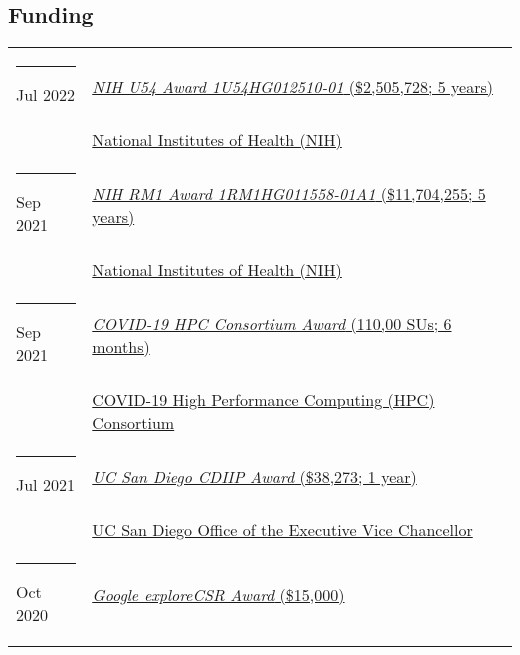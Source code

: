 \documentclass[margin,line]{res}
\begin{document}
\begin{resume}
\section{\sc Funding}
\begin{longtable}{@{}p{0.7in}p{4in}}
\hspace*{-4mm} \rule{-1mm}{5mm} Jul 2022 & \href{https://reporter.nih.gov/project-details/10307040}{\textit{NIH U54 Award 1U54HG012510-01} (\$2,505,728; 5 years)}\\*
\hspace*{-4mm} \hspace*{-4mm} & \hspace{4mm} \href{https://nih.gov}{National Institutes of Health (NIH)}\\
\hspace*{-4mm} \rule{-1mm}{5mm} Sep 2021 & \href{https://reporter.nih.gov/project-details/10307040}{\textit{NIH RM1 Award 1RM1HG011558-01A1} (\$11,704,255; 5 years)}\\*
\hspace*{-4mm} \hspace*{-4mm} & \hspace{4mm} \href{https://nih.gov}{National Institutes of Health (NIH)}\\
\hspace*{-4mm} \rule{-1mm}{5mm} Sep 2021 & \href{https://www.xsede.org/covid19-hpc-consortium}{\textit{COVID-19 HPC Consortium Award} (110,00 SUs; 6 months)}\\*
\hspace*{-4mm} \hspace*{-4mm} & \hspace{4mm} \href{https://covid19-hpc-consortium.org/}{COVID-19 High Performance Computing (HPC) Consortium}\\
\hspace*{-4mm} \rule{-1mm}{5mm} Jul 2021 & \href{https://academicaffairs.ucsd.edu/evc/cdiip.html}{\textit{UC San Diego CDIIP Award} (\$38,273; 1 year)}\\*
\hspace*{-4mm} \hspace*{-4mm} & \hspace{4mm} \href{https://academicaffairs.ucsd.edu/evc/cdiip.html}{UC San Diego Office of the Executive Vice Chancellor}\\
\hspace*{-4mm} \rule{-1mm}{5mm} Oct 2020 & \href{https://research.google/outreach/explore-csr/recipients/?category=2020}{\textit{Google exploreCSR Award} (\$15,000)}\\*

\end{longtable}
\end{resume}
\end{document}
